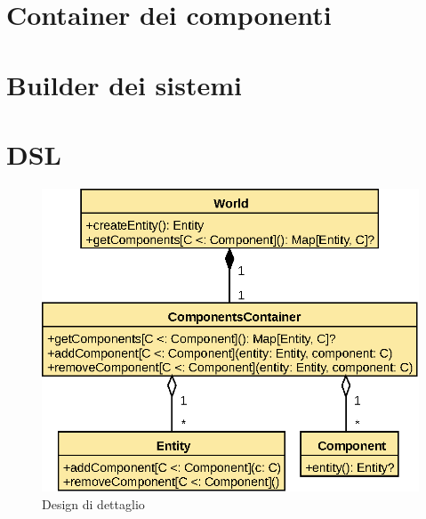 \section{Container dei componenti}\label{sec:container-dei-componenti}
\section{Builder dei sistemi}\label{sec:builder-dei-sistemi}
\section{DSL}\label{sec:dsl}

\begin{figure}
    \includegraphics{./img/WorldDetail}
    \caption{Design di dettaglio}
    \label{fig:figure2}
\end{figure}